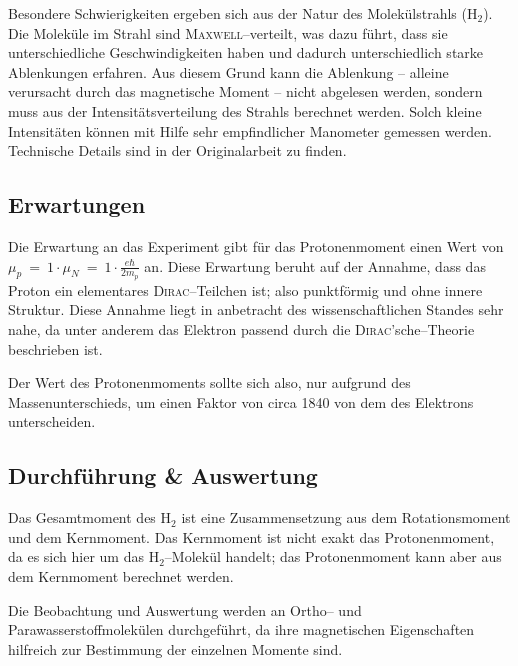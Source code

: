 \documentclass[sn-mathphys-num,iicol]{sn-jnl}
\theoremstyle{thmstyleone}
\theoremstyle{thmstyletwo}
\theoremstyle{thmstylethree}
\begin{document}
Besondere Schwierigkeiten ergeben sich aus der Natur des Molekülstrahls ($\text{H}_2$).
Die Moleküle im Strahl sind \textsc{Maxwell}--verteilt, was dazu führt, dass sie unterschiedliche Geschwindigkeiten haben und dadurch unterschiedlich starke Ablenkungen erfahren.
Aus diesem Grund kann die Ablenkung -- alleine verursacht durch das magnetische Moment -- nicht abgelesen werden, sondern muss aus der Intensitätsverteilung des Strahls berechnet werden.
Solch kleine Intensitäten können mit Hilfe sehr empfindlicher Manometer gemessen werden.
Technische Details sind in der Originalarbeit\cite{FrischStern1933} zu finden.

\subsection{Erwartungen}
Die Erwartung an das Experiment gibt für das Protonenmoment einen Wert von $\mu _p~=~1\cdot \mu _N~=~1\cdot \tfrac{e\hbar }{2m_p}$ an.
Diese Erwartung beruht auf der Annahme, dass das Proton ein elementares \textsc{Dirac}--Teilchen ist; also punktförmig und ohne innere Struktur.
Diese Annahme liegt in anbetracht des wissenschaftlichen Standes sehr nahe, da unter anderem das Elektron passend durch die \textsc{Dirac}'sche--Theorie beschrieben ist.

Der Wert des Protonenmoments sollte sich also, nur aufgrund des Massenunterschieds, um einen Faktor von circa 1840 von dem des Elektrons unterscheiden.\cite{FrischStern1933}

\subsection{Durchführung \& Auswertung}
Das Gesamtmoment des $\text{H}_2$ ist eine Zusammensetzung aus dem Rotationsmoment und dem Kernmoment.
Das Kernmoment ist nicht exakt das Protonenmoment, da es sich hier um das $\text{H}_2$--Molekül handelt; das Protonenmoment kann aber aus dem Kernmoment berechnet werden.

Die Beobachtung und Auswertung werden an Ortho-- und Parawasserstoffmolekülen durchgeführt, da ihre magnetischen Eigenschaften hilfreich zur Bestimmung der einzelnen Momente sind.
\end{document}
